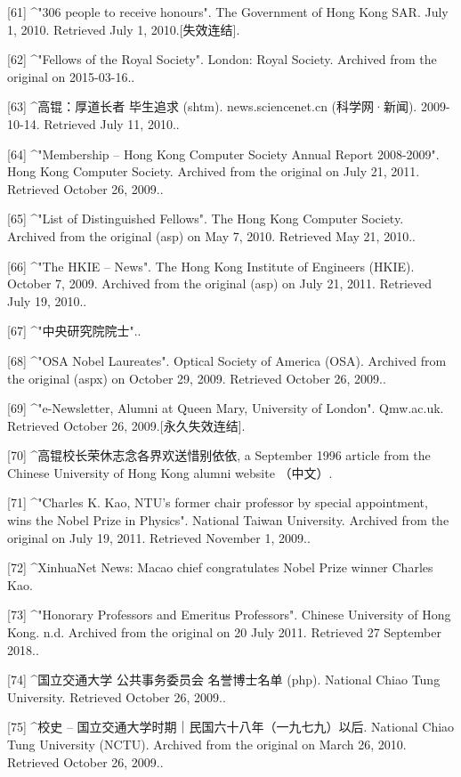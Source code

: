 [61]
^"306 people to receive honours". The Government of Hong Kong SAR. July 1, 2010. Retrieved July 1, 2010.[失效连结].

[62]
^"Fellows of the Royal Society". London: Royal Society. Archived from the original on 2015-03-16..

[63]
^高锟：厚道长者 毕生追求 (shtm). news.sciencenet.cn (科学网·新闻). 2009-10-14. Retrieved July 11, 2010..

[64]
^"Membership – Hong Kong Computer Society Annual Report 2008-2009". Hong Kong Computer Society. Archived from the original on July 21, 2011. Retrieved October 26, 2009..

[65]
^"List of Distinguished Fellows". The Hong Kong Computer Society. Archived from the original (asp) on May 7, 2010. Retrieved May 21, 2010..

[66]
^"The HKIE – News". The Hong Kong Institute of Engineers (HKIE). October 7, 2009. Archived from the original (asp) on July 21, 2011. Retrieved July 19, 2010..

[67]
^"中央研究院院士"..

[68]
^"OSA Nobel Laureates". Optical Society of America (OSA). Archived from the original (aspx) on October 29, 2009. Retrieved October 26, 2009..

[69]
^"e-Newsletter, Alumni at Queen Mary, University of London". Qmw.ac.uk. Retrieved October 26, 2009.[永久失效连结].

[70]
^高锟校长荣休志念各界欢送惜别依依, a September 1996 article from the Chinese University of Hong Kong alumni website （中文）.

[71]
^"Charles K. Kao, NTU's former chair professor by special appointment, wins the Nobel Prize in Physics". National Taiwan University. Archived from the original on July 19, 2011. Retrieved November 1, 2009..

[72]
^XinhuaNet News: Macao chief congratulates Nobel Prize winner Charles Kao.

[73]
^"Honorary Professors and Emeritus Professors". Chinese University of Hong Kong. n.d. Archived from the original on 20 July 2011. Retrieved 27 September 2018..

[74]
^国立交通大学 公共事务委员会 名誉博士名单 (php). National Chiao Tung University. Retrieved October 26, 2009..

[75]
^校史 – 国立交通大学时期｜民国六十八年（一九七九）以后. National Chiao Tung University (NCTU). Archived from the original on March 26, 2010. Retrieved October 26, 2009..

